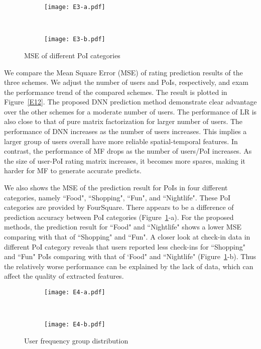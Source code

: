 \begin{figure}[htb]%
        \centering
        \begin{subfigure}{0.25\textwidth}
               \texttt{[image: E3-a.pdf]}
        \end{subfigure}%
        ~ %
        \begin{subfigure}{0.25\textwidth}
                \texttt{[image: E3-b.pdf]}
        \end{subfigure}
         \caption{MSE of different PoI categories}\label{E3}
         \vspace{-2mm}
\end{figure}

We compare the Mean Square Error (MSE) of rating prediction results of the three schemes. We adjust the number of users and PoIs, respectively, and exam the performance trend of the compared schemes. The result is plotted in Figure~\ref{E12}. The proposed DNN prediction method demonstrate clear advantage over the other schemes for a moderate number of users. The performance of LR is also close to that of pure matrix factorization for larger number of users. The performance of DNN increases as the number of users increases. This implies a larger group of users overall have more reliable spatial-temporal features. In contrast, the performance of MF drops as the number of users/PoI increases. As the size of user-PoI rating matrix increases, it becomes more spares, making it harder for MF to generate accurate predicts. 

We also shows the MSE of the prediction result for PoIs in four different categories, namely ``Food", ``Shopping", ``Fun", and ``Nightlife". These PoI categories are provided by FourSquare. There appears to be a difference of prediction accuracy between PoI categories (Figure~\ref{E3}-a). For the proposed methods, the prediction result for ``Food" and ``Nightlife" shows a lower MSE comparing with that of ``Shopping" and ``Fun". A closer look at check-in data in different PoI category reveals that users reported less check-ins for ``Shopping" and ``Fun" PoIs comparing with that of `Food" and ``Nightlife" (Figure~\ref{E3}-b). Thus the relatively worse performance can be explained by the lack of data, which can affect the quality of extracted features.


\begin{figure}[htbp]%
        \centering
        \begin{subfigure}{0.25\textwidth}
               \texttt{[image: E4-a.pdf]}
        \end{subfigure}%
        ~ %
        \begin{subfigure}{0.25\textwidth}
                \texttt{[image: E4-b.pdf]}
        \end{subfigure}
         \caption{User frequency group distribution}\label{E4}
         \vspace{-2mm}
\end{figure}

